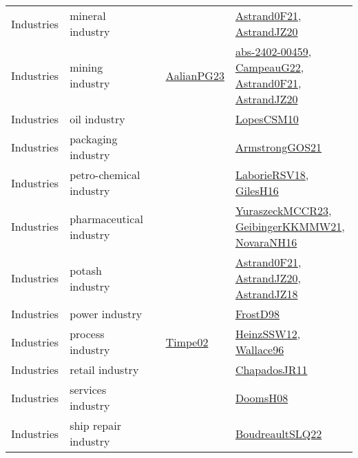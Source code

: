 {\begin{longtable}{lp{3cm}>{\raggedright}p{6cm}>{\raggedright}p{6cm}p{8cm}}
Industries & mineral industry &  &  & \href{papers/Astrand0F21.pdf}{Astrand0F21}\cite{Astrand0F21}, \href{articles/AstrandJZ20.pdf}{AstrandJZ20}\cite{AstrandJZ20}\\
Industries & mining industry &  & \href{papers/AalianPG23.pdf}{AalianPG23}\cite{AalianPG23} & \href{articles/abs-2402-00459.pdf}{abs-2402-00459}\cite{abs-2402-00459}, \href{articles/CampeauG22.pdf}{CampeauG22}\cite{CampeauG22}, \href{papers/Astrand0F21.pdf}{Astrand0F21}\cite{Astrand0F21}, \href{articles/AstrandJZ20.pdf}{AstrandJZ20}\cite{AstrandJZ20}\\
Industries & oil industry &  &  & \href{articles/LopesCSM10.pdf}{LopesCSM10}\cite{LopesCSM10}\\
Industries & packaging industry &  &  & \href{papers/ArmstrongGOS21.pdf}{ArmstrongGOS21}\cite{ArmstrongGOS21}\\
Industries & petro-chemical industry &  &  & \href{articles/LaborieRSV18.pdf}{LaborieRSV18}\cite{LaborieRSV18}, \href{papers/GilesH16.pdf}{GilesH16}\cite{GilesH16}\\
Industries & pharmaceutical industry &  &  & \href{articles/YuraszeckMCCR23.pdf}{YuraszeckMCCR23}\cite{YuraszeckMCCR23}, \href{papers/GeibingerKKMMW21.pdf}{GeibingerKKMMW21}\cite{GeibingerKKMMW21}, \href{articles/NovaraNH16.pdf}{NovaraNH16}\cite{NovaraNH16}\\
Industries & potash industry &  &  & \href{papers/Astrand0F21.pdf}{Astrand0F21}\cite{Astrand0F21}, \href{articles/AstrandJZ20.pdf}{AstrandJZ20}\cite{AstrandJZ20}, \href{papers/AstrandJZ18.pdf}{AstrandJZ18}\cite{AstrandJZ18}\\
Industries & power industry &  &  & \href{papers/FrostD98.pdf}{FrostD98}\cite{FrostD98}\\
Industries & process industry &  & \href{articles/Timpe02.pdf}{Timpe02}\cite{Timpe02} & \href{articles/HeinzSSW12.pdf}{HeinzSSW12}\cite{HeinzSSW12}, \href{articles/Wallace96.pdf}{Wallace96}\cite{Wallace96}\\
Industries & retail industry &  &  & \href{papers/ChapadosJR11.pdf}{ChapadosJR11}\cite{ChapadosJR11}\\
Industries & services industry &  &  & \href{papers/DoomsH08.pdf}{DoomsH08}\cite{DoomsH08}\\
Industries & ship repair industry &  &  & \href{papers/BoudreaultSLQ22.pdf}{BoudreaultSLQ22}\cite{BoudreaultSLQ22}\\

\end{longtable}}
